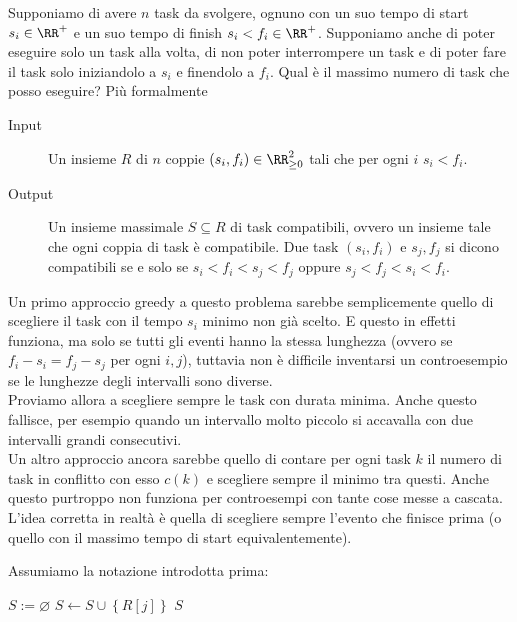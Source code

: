 \documentclass[11pt]{scrartcl}
\begin{document}
	\begin{example}
		Supponiamo di avere $n$ task da svolgere, ognuno con un suo tempo di start $s_i\in\RR^+$ e un suo tempo di finish $s_i<f_i\in\RR^+$. Supponiamo anche di poter eseguire solo un task alla volta, di non poter interrompere un task e di poter fare il task solo iniziandolo a $s_i$ e finendolo a $f_i$. Qual è il massimo numero di task che posso eseguire? Più formalmente
		\begin{description}
			\item[Input] Un insieme $R$ di $n$ coppie $(s_i,f_i)\in\RR_{\ge 0}^2$ tali che per ogni $i$ $s_i<f_i$.
			\item[Output] Un insieme massimale $S\subseteq R$ di task compatibili, ovvero un insieme tale che ogni coppia di task è compatibile. Due task $(s_i,f_i)$ e $s_j,f_j$ si dicono compatibili se e solo se $s_i<f_i<s_j<f_j$ oppure $s_j<f_j<s_i<f_i$. 
		\end{description}
	\end{example}
	Un primo approccio greedy a questo problema sarebbe semplicemente quello di scegliere il task con il tempo $s_i$ minimo non già scelto. E questo in effetti funziona, ma solo se tutti gli eventi hanno la stessa lunghezza (ovvero se $f_i-s_i=f_j-s_j$ per ogni $i,j$), tuttavia non è difficile inventarsi un controesempio se le lunghezze degli intervalli sono diverse.\\
	Proviamo allora a scegliere sempre le task con durata minima. Anche questo fallisce, per esempio quando un intervallo molto piccolo si accavalla con due intervalli grandi consecutivi. \\
	Un altro approccio ancora sarebbe quello di contare per ogni task $k$ il numero di task in conflitto con esso $c(k)$ e scegliere sempre il minimo tra questi. Anche questo purtroppo non funziona per controesempi con tante cose messe a cascata. \\
	L'idea corretta in realtà è quella di scegliere sempre l'evento che finisce prima (o quello con il massimo tempo di start equivalentemente).
	\begin{algorithm}
		Assumiamo la notazione introdotta prima:
		\begin{algorithmic}[1]
				\State {}
				\State $S:=\varnothing$ 
						\State $S\gets S\cup \left\{R[j]\right\}$
					\EndIf
				\EndFor
				\State \Return $S$
			\EndFunction
		\end{algorithmic}
	\end{algorithm}
\end{document}
